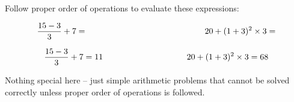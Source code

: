 

Follow proper order of operations to evaluate these expressions:

$${15 - 3 \over 3} + 7 = \hskip 140pt 20 + (1 + 3)^2 \times 3 = $$







$${15 - 3 \over 3} + 7 = 11 \hskip 100pt 20 + (1 + 3)^2 \times 3 = 68$$







Nothing special here -- just simple arithmetic problems that cannot be solved correctly unless proper order of operations is followed.




